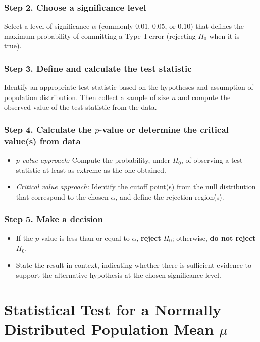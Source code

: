 \documentclass[twoside]{book}
\begin{document}
	\subsubsection*{Step 2. Choose a significance level}
	Select a level of significance $\alpha$ (commonly 0.01, 0.05, or 0.10) that defines the maximum probability of committing a Type I error (rejecting $H_0$ when it is true).

	\subsubsection*{Step 3. Define and calculate the test statistic}
	Identify an appropriate test statistic based on the hypotheses and assumption of population distribution. Then collect a sample of size $n$ and compute the observed value of the test statistic from the data.

	\subsubsection*{Step 4. Calculate the $ p $­-value or determine the critical value(s) from data}
	\begin{itemize}
		\item \emph{$ p $­-value approach:} Compute the probability, under $H_0$, of observing a test statistic at least as extreme as the one obtained.
		\item \emph{Critical value approach:} Identify the cutoff point(s) from the null distribution that correspond to the chosen $\alpha$, and define the rejection region(s).
	\end{itemize}

	\subsubsection*{Step 5. Make a decision}
	\begin{itemize}
		\item If the $ p $­-value is less than or equal to $\alpha$, \textbf{reject} $H_0$; otherwise, \textbf{do not reject} $H_0$.
		\item State the result in context, indicating whether there is sufficient evidence to support the alternative hypothesis at the chosen significance level.
	\end{itemize}

\section{Statistical Test for a Normally Distributed Population Mean \(\mu\)}
\end{document}
